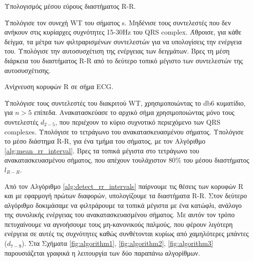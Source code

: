 \documentclass[11pt,a4paper]{article}
\renewcommand{\figurename}{Σχήμα}
\begin{document}
\begin{algorithm}  
  \caption{Υπολογισμός μέσου εύρους διαστήματος R-R.}
  \label{alg:mean_rr_interval}  
  \begin{algorithmic}[1]  
  	
  	\State Υπολόγισε τον συνεχή WT του σήματος s.
  	\State Μηδένισε τους συντελεστές που δεν ανήκουν στις κυρίαρχες συχνότητες 15-30Hz του QRS complex.
  	\State Άθροισε, για κάθε δείγμα, τα μέτρα των φιλτραρισμένων συντελεστών για να υπολογίσεις την ενέργεια του.
  	\State Υπολόγισε την αυτοσυσχέτιση της ενέργειας των δειγμάτων.
  	\State Βρες τη μέση διάρκεια του διαστήματος R-R από το δεύτερο τοπικό μέγιστο των συντελεστών της αυτοσυσχέτισης.
  	
  \end{algorithmic}  
\end{algorithm}

\begin{algorithm}  
  \caption{Ανίχνευση κορυφών R σε σήμα ECG.}
  \label{alg:detect_rr_intervals}  
  \begin{algorithmic}[1]  
  	
  	\State Υπολόγισε τους συντελεστές του διακριτού WT, χρησιμοποιώντας το db6 κυματίδιο, για $n>5$ επίπεδα.
  	\State Ανακατασκεύασε το αρχικό σήμα χρησιμοποιώντας μόνο τους συντελεστές $d_{2-5}$, που περιέχουν το κύριο συχνοτικό περιεχόμενο των QRS complexes.
  	\State Υπολόγισε το τετράγωνο του ανακατασκευασμένου σήματος.
  	\State Υπολόγισε το μέσο διάστημα R-R, για ένα τμήμα του σήματος, με τον Αλγόριθμο \ref{alg:mean_rr_interval}.
  	\State Βρες τα τοπικά μέγιστα στο τετράγωνο του ανακατασκευασμένου σήματος, που απέχουν τουλάχιστον $80\%$ του μέσου διαστήματος $l_{R-R}$.
  	
  \end{algorithmic}  
\end{algorithm}

Από τον Αλγόριθμο \ref{alg:detect_rr_intervals} παίρνουμε τις θέσεις των κορυφών R και με εφαρμογή πρώτων διαφορών, υπολογίζουμε τα διαστήματα R-R. Στον δεύτερο αλγόριθμο δοκιμάσαμε να φιλτράρουμε τα τοπικά μέγιστα με ένα κατώφλι, ανάλογο της συνολικής ενέργειας του ανακατασκευασμένου σήματος. Με αυτόν τον τρόπο πετυχαίνουμε να αγνοήσουμε τους μη-κανονικούς παλμούς, που φέρουν λιγότερη ενέργεια σε αυτές τις συχνότητες καθώς συνθέτονται κυρίως από χαμηλότερες μπάντες ($d_{7-9}$).
Στα \figurename{τα \ref{fig:algorithm1}, \ref{fig:algorithm2}, \ref{fig:algorithm3}} παρουσιάζεται γραφικά η λειτουργία των δύο παραπάνω αλγορίθμων.
\end{document}
